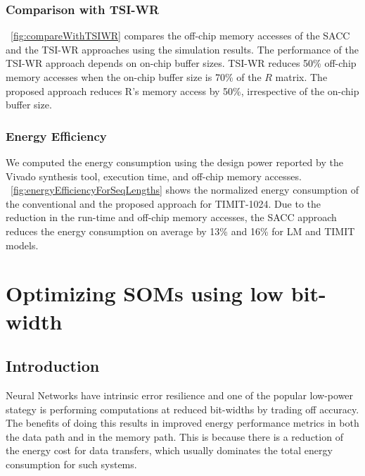 \documentclass[a4paper,10pt]{article}
\begin{document}
\subsubsection{Comparison with TSI-WR}
\figurename{~\ref{fig:compareWithTSIWR}} compares the off-chip memory accesses of the SACC and the TSI-WR approaches using the simulation results. The performance of the TSI-WR approach depends on on-chip buffer sizes. TSI-WR reduces 50\% off-chip memory accesses when the on-chip buffer size is 70\% of the $R$ matrix. The proposed approach reduces R's memory access by 50\%, irrespective of the on-chip buffer size.
\subsubsection{Energy Efficiency}
We computed the energy consumption using the design power reported by the Vivado synthesis tool, execution time, and off-chip memory accesses. \figurename{~\ref{fig:energyEfficiencyForSeqLengths}} shows the normalized energy consumption of the conventional and the proposed approach for TIMIT-1024. Due to the reduction in the run-time and off-chip memory accesses, the SACC approach reduces the energy consumption on average by 13\% and 16\% for LM and TIMIT models.


\section{Optimizing SOMs using low bit-width}
\subsection{Introduction}
Neural Networks have intrinsic error resilience and one of the popular low-power stategy is performing computations at reduced bit-widths by trading off accuracy. The benefits of doing this results in improved energy performance metrics in both the data path and in the memory path. This is because there is a reduction of the energy cost for data transfers, which usually dominates the total energy consumption for such systems.

\end{document}

